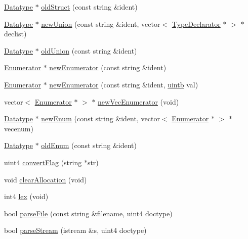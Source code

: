 \begin{DoxyCompactItemize}
\item 
\mbox{\hyperlink{class_datatype}{Datatype}} $\ast$ \mbox{\hyperlink{class_c_parse_a3f3a9630b4dcbc3549a437604493986e}{old\+Struct}} (const string \&ident)
\item 
\mbox{\hyperlink{class_datatype}{Datatype}} $\ast$ \mbox{\hyperlink{class_c_parse_a617280e1818c23016f6d440aa9c9d9db}{new\+Union}} (const string \&ident, vector$<$ \mbox{\hyperlink{class_type_declarator}{Type\+Declarator}} $\ast$ $>$ $\ast$declist)
\item 
\mbox{\hyperlink{class_datatype}{Datatype}} $\ast$ \mbox{\hyperlink{class_c_parse_a499bd3b597a080a70422346c717161d5}{old\+Union}} (const string \&ident)
\item 
\mbox{\hyperlink{struct_enumerator}{Enumerator}} $\ast$ \mbox{\hyperlink{class_c_parse_a41b3e38981d834661c185d4c16787934}{new\+Enumerator}} (const string \&ident)
\item 
\mbox{\hyperlink{struct_enumerator}{Enumerator}} $\ast$ \mbox{\hyperlink{class_c_parse_a760db39f4211537b3471c7f6f614b8ac}{new\+Enumerator}} (const string \&ident, \mbox{\hyperlink{types_8h_a2db313c5d32a12b01d26ac9b3bca178f}{uintb}} val)
\item 
vector$<$ \mbox{\hyperlink{struct_enumerator}{Enumerator}} $\ast$ $>$ $\ast$ \mbox{\hyperlink{class_c_parse_ad7c7c258d545f0caaf27cc8c0ac56807}{new\+Vec\+Enumerator}} (void)
\item 
\mbox{\hyperlink{class_datatype}{Datatype}} $\ast$ \mbox{\hyperlink{class_c_parse_a6ee2dc779cf7d45596f96d143d908c87}{new\+Enum}} (const string \&ident, vector$<$ \mbox{\hyperlink{struct_enumerator}{Enumerator}} $\ast$ $>$ $\ast$vecenum)
\item 
\mbox{\hyperlink{class_datatype}{Datatype}} $\ast$ \mbox{\hyperlink{class_c_parse_a1bc333d7eb8f7976f5f510e30f234c5f}{old\+Enum}} (const string \&ident)
\item 
uint4 \mbox{\hyperlink{class_c_parse_afeb074247c8851b2b06e912964e7cc30}{convert\+Flag}} (string $\ast$str)
\item 
void \mbox{\hyperlink{class_c_parse_a2b275d0adfbf23c3d6241f3cd52dc7a3}{clear\+Allocation}} (void)
\item 
int4 \mbox{\hyperlink{class_c_parse_a70098c876c6832ab7f05670eb1d99b37}{lex}} (void)
\item 
bool \mbox{\hyperlink{class_c_parse_ae38f99d869ad987da0d5bbf2725f8ad9}{parse\+File}} (const string \&filename, uint4 doctype)
\item 
bool \mbox{\hyperlink{class_c_parse_a98fdd0bf6732406e9ba9b7b52ff1315f}{parse\+Stream}} (istream \&s, uint4 doctype)

\end{DoxyCompactItemize}
